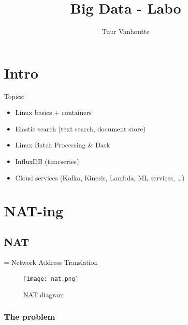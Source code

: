 \documentclass{article}
\begin{document}
\begin{titlepage}
    \author{Tuur Vanhoutte}
    \title{Big Data - Labo}
\end{titlepage}

\maketitle
\newpage
\tableofcontents
\newpage


\section{Intro}

Topics:

\begin{itemize}
    \item Linux basics + containers
    \item Elastic search (text search, document store)
    \item Linux Batch Processing \& Dask
    \item InfluxDB (timeseries)
    \item Cloud services (Kafka, Kinesis, Lambda, ML services, \dots)
\end{itemize}

\section{NAT-ing}

\subsection{NAT}

= Network Address Translation

\begin{figure}[H]
    \centering
    \texttt{[image: nat.png]}
    \caption{NAT diagram}
\end{figure}

\subsubsection{The problem}
\end{document}

